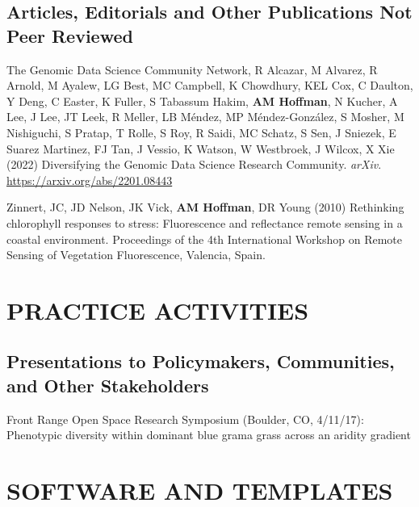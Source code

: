 \documentclass{cv}
\begin{document}
\subsection*{Articles, Editorials and Other Publications Not Peer Reviewed}

The Genomic Data Science Community Network, R Alcazar, M Alvarez, R Arnold, M Ayalew, LG Best, MC Campbell, K Chowdhury, KEL Cox, C Daulton, Y Deng, C Easter, K Fuller, S Tabassum Hakim, \textbf{AM Hoffman}\footnotemark[1], N Kucher, A Lee, J Lee, JT Leek, R Meller, LB Méndez, MP Méndez-González, S Mosher, M Nishiguchi, S Pratap, T Rolle, S Roy, R Saidi, MC Schatz, S Sen, J Sniezek, E Suarez Martinez, FJ Tan, J Vessio, K Watson, W Westbroek, J Wilcox, X Xie (2022) Diversifying the Genomic Data Science Research Community. \textit{arXiv}. \href{https://arxiv.org/abs/2201.08443}{https://arxiv.org/abs/2201.08443}

Zinnert, JC, JD Nelson, JK Vick, \textbf{AM Hoffman}, DR Young (2010) Rethinking chlorophyll responses to stress: Fluorescence and reflectance remote sensing in a coastal environment. Proceedings of the 4th International Workshop on Remote Sensing of Vegetation Fluorescence, Valencia, Spain.


\section*{PRACTICE ACTIVITIES}

\subsection*{Presentations to Policymakers, Communities, and Other Stakeholders}

Front Range Open Space Research Symposium (Boulder, CO, 4/11/17): Phenotypic diversity within dominant blue grama grass across an aridity gradient


\section*{SOFTWARE AND TEMPLATES}
\end{document}
